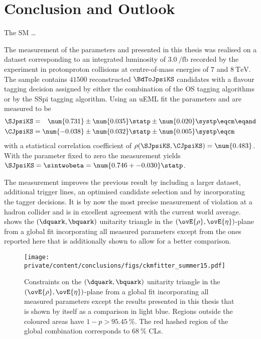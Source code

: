 
\chapter{Conclusion and Outlook}
\label{ch:conclusion}

The \acl{SM} \dots


The measurement of the \CP parameters \SJpsiKS and \CJpsiKS presented in this
thesis was realised on a dataset corresponding to an integrated luminosity of
$\SI{3.0}{\per\femto\barn}$ recorded by the \LHCb experiment in
\acl{protonproton} collisions at centre-of-mass energies of $\num{7}$ and
$\SI{8}{\TeV}$. The sample contains $\num{41500}$ reconstructed $\BdToJpsiKS$
candidates with a flavour tagging decision assigned by either the combination of
the \acl{OS} tagging algorithms or by the \acl{SSpi} tagging algorithm. Using an
\acl{uEML} fit the \CP parameters \SJpsiKS and \CJpsiKS are measured to be
%
\begin{equation*}
  \begin{split}
    \SJpsiKS &= \phantom{-}\num{0.731} \pm \num{0.035} \statp \pm \num{0.020} \systp \eqcm\eqand \\
    \CJpsiKS &=           \num{-0.038} \pm \num{0.032} \statp \pm \num{0.005} \systp \eqcm
  \end{split}
\end{equation*}
%
with a statistical correlation coefficient of $\rho(\SJpsiKS,\CJpsiKS) =
\num{0.483}$. With the parameter \CJpsiKS fixed to zero the measurement yields
$\SJpsiKS = \sintwobeta = \num{0.746 +- 0.030}\statp$.

The measurement improves the previous \LHCb result \cite{Aaij:1497268} by
including a larger dataset, additional trigger lines, an optimised candidate
selection and by incorporating the \SSpi tagger decisions. It is by now the most
precise measurement of \CP violation at a hadron collider and is in excellent
agreement with the current world average. 
shows the ${(\dquark,\bquark)}$ unitarity triangle in the
${(\ovE{\rho},\ovE{\eta})}$-plane from a global fit incorporating all measured
\CKM parameters \cite{Charles:2004jd} except from the ones reported here that is
additionally shown to allow for a better comparison.
%
\begin{figure}[ht]
\centering
\texttt{[image: private/content/conclusions/figs/ckmfitter\_summer15.pdf]}
\caption{Constraints on the ${(\dquark,\bquark)}$ unitarity triangle in the
${(\ovE{\rho},\ovE{\eta})}$-plane from a global fit incorporating all measured
\CKM parameters \cite{Charles:2004jd} except the results presented in this
thesis that is shown by itself as a comparison in light blue. Regions outside
the coloured areas have $1-p > \SI{95.45}{\percent}$. The red hashed region of
the global combination corresponds to $\SI{68}{\percent}$ \acp{CL}.}
\label{fig:conclusion:ckm_fitter_15}
\end{figure}


